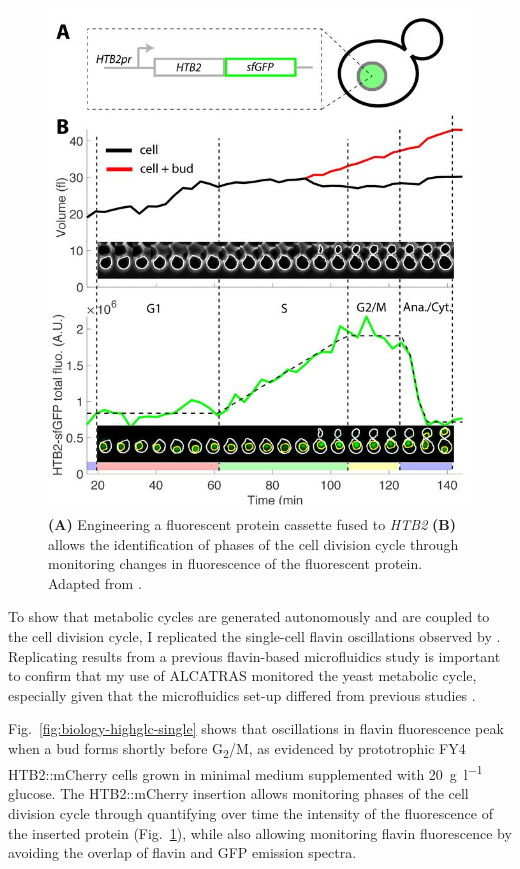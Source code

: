 \begin{figure}
  \centering
    \includegraphics[width=0.5\linewidth]{garmendia-torresMultipleInputsEnsure2018_1_adapted.jpg}
    \caption[
      Engineering a fluorescent protein cassette fused to \textit{HTB2} allows the identification of phases of the cell division cycle through monitoring changes in fluorescence of the fluorescent protein.
    ]{
      \textbf{(A)} Engineering a fluorescent protein cassette fused to \textit{HTB2} \textbf{(B)} allows the identification of phases of the cell division cycle through monitoring changes in fluorescence of the fluorescent protein.
      Adapted from \textcite{garmendia-torresMultipleInputsEnsure2018}.
    }
  \label{fig:biology-htb2}
\end{figure}

To show that metabolic cycles are generated autonomously and are coupled to the cell division cycle, I replicated the single-cell flavin oscillations observed by \textcite{baumgartnerFlavinbasedMetabolicCycles2018}.
Replicating results from a previous flavin-based microfluidics study is important to confirm that my use of ALCATRAS \parencite{craneMicrofluidicSystemStudying2014} monitored the yeast metabolic cycle, especially given that the microfluidics set-up differed from previous studies \parencite{papagiannakisAutonomousMetabolicOscillations2017, baumgartnerFlavinbasedMetabolicCycles2018}.

Fig.\ \ref{fig:biology-highglc-single} shows that oscillations in flavin fluorescence peak when a bud forms shortly before G\textsubscript{2}/M, as evidenced by prototrophic FY4 HTB2::mCherry cells grown in minimal medium supplemented with \SI{20}{\gram~\litre^{-1}} glucose.
The HTB2::mCherry insertion allows monitoring phases of the cell division cycle through quantifying over time the intensity of the fluorescence of the inserted protein \parencite{garmendia-torresMultipleInputsEnsure2018} (Fig.\ \ref{fig:biology-htb2}), while also allowing monitoring flavin fluorescence by avoiding the overlap of flavin and GFP emission spectra.

